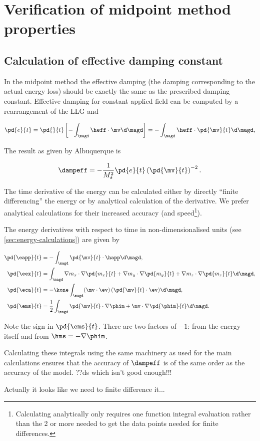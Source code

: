 
\chapter{Verification of midpoint method properties}

\section{Calculation of effective damping constant}
\label{sec:exact-damp-const}

In the midpoint method the effective damping (\ie the damping corresponding to the actual energy loss) should be exactly the same as the prescribed damping constant.
Effective damping for constant applied field can be computed by a rearrangement of the LLG and

\begin{equation}
  \pd{e}{t} = \pd{}{t} \left[ - \int_\magd \heff \cdot \mv \d \magd \right] = - \int_\magd \heff \cdot \pd{\mv}{t} \d \magd,
\end{equation}

The result as given by Albuquerque \etal \cite{Albuquerque2001} is

\begin{equation}
  \dampeff = - \frac{1}{M_s^2} \pd{e}{t}  \left( \pd{\mv}{t} \right)^{-2}.
\end{equation}


The time derivative of the energy can be calculated either by directly ``finite differencing'' the energy or by analytical calculation of the derivative.
We prefer analytical calculations for their increased accuracy (and speed\footnote{Calculating analytically only requires one function integral evaluation rather than the 2 or more needed to get the data points needed for finite differences.}).

The energy derivatives with respect to time in non-dimensionalised units (see \autoref{sec:energy-calculations}) are given by

\begin{align}
  \pd{\eapp}{t} &= - \int_\magd \pd{\mv}{t} \cdot \happ \d\magd, \\
  \pd{\eex}{t} &= \int_\magd \nabla m_x \cdot \nabla \pd{m_x}{t}
           + \nabla m_y \cdot \nabla \pd{m_y}{t}
           + \nabla m_z \cdot \nabla \pd{m_z}{t} \d\magd, \\
  \pd{\eca}{t} &= - \kone \int_\magd (\mv \cdot \ev )\, (\pd{\mv}{t} \cdot \ev) \d\magd, \\
  \pd{\ems}{t} &= \frac{1}{2} \int_\magd \pd{\mv}{t} \cdot \nabla \phim
       + \mv \cdot \nabla \pd{\phim}{t} \d\magd.
\end{align}

Note the sign in $\pd{\ems}{t}$. There are two factors of $-1$: from the energy itself and from $\hms = - \nabla \phim$.

Calculating these integrals using the same machinery as used for the main calculations ensures that the accuracy of $\dampeff$ is of the same order as the accuracy of the model. ??ds which isn't good enough!!!

Actually it looks like we need to finite difference it...

